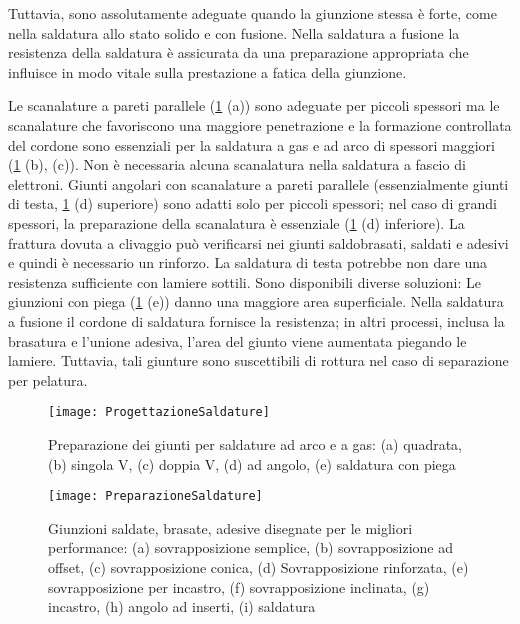 Tuttavia, sono assolutamente adeguate quando la giunzione stessa è forte, come nella saldatura allo stato solido e con fusione.
Nella saldatura a fusione la resistenza della saldatura è assicurata da una preparazione appropriata che influisce in modo vitale sulla prestazione a fatica della giunzione.

Le scanalature a pareti parallele (\ref{fig:ProgettazioneSaldature} (a)) sono adeguate per piccoli spessori ma le scanalature che favoriscono una maggiore penetrazione e la formazione controllata del cordone sono essenziali per la saldatura a gas e ad arco di spessori maggiori (\ref{fig:ProgettazioneSaldature} (b), (c)).
Non è necessaria alcuna scanalatura nella saldatura a fascio di elettroni.
Giunti angolari con scanalature a pareti parallele (essenzialmente giunti di testa, \ref{fig:ProgettazioneSaldature} (d) superiore) sono adatti solo per piccoli spessori; nel caso di grandi spessori, la preparazione della scanalatura è essenziale (\ref{fig:ProgettazioneSaldature} (d) inferiore).
La frattura dovuta a clivaggio può verificarsi nei giunti saldobrasati, saldati e adesivi e quindi è necessario un rinforzo.
La saldatura di testa potrebbe non dare una resistenza sufficiente con lamiere sottili. Sono disponibili diverse soluzioni:
Le giunzioni con piega (\ref{fig:ProgettazioneSaldature} (e)) danno una maggiore area superficiale. Nella saldatura a fusione il cordone di saldatura fornisce la resistenza; in altri processi, inclusa la brasatura e l'unione adesiva, l'area del giunto viene aumentata piegando le lamiere.
Tuttavia, tali giunture sono suscettibili di rottura nel caso di separazione per pelatura.

\begin{figure}
\centering
\texttt{[image: ProgettazioneSaldature]}
\caption{Preparazione dei giunti per saldature ad arco e a gas:
(a) quadrata, (b) singola V, (c) doppia V, (d) ad angolo, (e) saldatura con piega}
\label{fig:ProgettazioneSaldature}
\end{figure}

\begin{figure}
\centering
\texttt{[image: PreparazioneSaldature]}
\caption{Giunzioni saldate, brasate, adesive disegnate per le migliori performance: (a) sovrapposizione semplice, (b) sovrapposizione ad offset, (c) sovrapposizione conica, (d) Sovrapposizione rinforzata, (e) sovrapposizione per incastro, (f) sovrapposizione inclinata, (g) incastro, (h) angolo ad inserti, (i) saldatura}
\label{fig:PreparazioneSaldature}
\end{figure}

